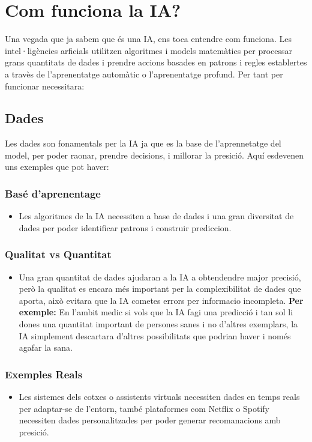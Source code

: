 \section{Com funciona la IA?}
Una vegada que ja sabem que és una IA, ens toca entendre com funciona. Les intel·ligències arficials utilitzen algoritmes i models matemàtics per processar grans quantitats de dades i prendre accions basades en patrons i regles establertes a travès de l'aprenentatge automàtic o l'aprenentatge profund. Per tant per funcionar necessitara:    \   \  \  \   \  \ 

\subsection{Dades}\label{subsec:Dades}
Les dades son fonamentals per la IA ja que es la base de l'aprennetatge del model, per poder raonar, prendre decisions, i millorar la presició. Aquí esdevenen uns exemples que pot haver:

\subsubsection{Basé d'aprenentage}
\begin{itemize}
 \item Les algoritmes de la IA necessiten a base de dades i una gran diversitat de dades per poder identificar patrons i construir prediccion.
\end{itemize}
\subsubsection{Qualitat vs Quantitat}
\begin{itemize}
\item Una gran quantitat de dades ajudaran a la IA a obtendendre major precisió, però la qualitat es encara més important per la complexibilitat de dades que aporta, això evitara que la IA cometes errors per informacio incompleta.\textbf{ Per exemple:} {\color{blue}En l'ambit medic si vols que la IA fagi una predicció i tan sol li dones una quantitat important de persones sanes i no d'altres exemplars, la IA simplement descartara d'altres possibilitats que podrian haver i només agafar la sana.}
\end{itemize}
\subsubsection{Exemples Reals}
\begin{itemize}
 \item Les sistemes dels cotxes o assistents virtuals necessiten dades en temps reals per adaptar-se de l'entorn, també plataformes com Netflix o Spotify necessiten dades personalitzades per poder generar recomanacions amb presició.
\end{itemize}
